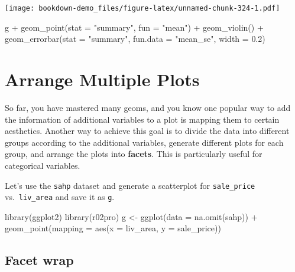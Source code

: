 \documentclass[
]{book}
\newenvironment{Shaded}{\begin{snugshade}}{\end{snugshade}}
\newcommand{\AttributeTok}[1]{\textcolor[rgb]{0.77,0.63,0.00}{#1}}
\newcommand{\FloatTok}[1]{\textcolor[rgb]{0.00,0.00,0.81}{#1}}
\newcommand{\FunctionTok}[1]{\textcolor[rgb]{0.00,0.00,0.00}{#1}}
\newcommand{\NormalTok}[1]{#1}
\newcommand{\OtherTok}[1]{\textcolor[rgb]{0.56,0.35,0.01}{#1}}
\newcommand{\SpecialCharTok}[1]{\textcolor[rgb]{0.00,0.00,0.00}{#1}}
\newcommand{\StringTok}[1]{\textcolor[rgb]{0.31,0.60,0.02}{#1}}
\begin{document}
\texttt{[image: bookdown-demo\_files/figure-latex/unnamed-chunk-324-1.pdf]}

\begin{Shaded}
\begin{Highlighting}[]
\NormalTok{g  }\SpecialCharTok{+} \FunctionTok{geom\_point}\NormalTok{(}\AttributeTok{stat =} \StringTok{"summary"}\NormalTok{, }\AttributeTok{fun =} \StringTok{"mean"}\NormalTok{) }\SpecialCharTok{+} 
  \FunctionTok{geom\_violin}\NormalTok{() }\SpecialCharTok{+} 
  \FunctionTok{geom\_errorbar}\NormalTok{(}\AttributeTok{stat =} \StringTok{"summary"}\NormalTok{, }\AttributeTok{fun.data =} \StringTok{"mean\_se"}\NormalTok{, }\AttributeTok{width =} \FloatTok{0.2}\NormalTok{)}
\end{Highlighting}
\end{Shaded}

\hypertarget{arrange-multi-plots}{%
\section{Arrange Multiple Plots}\label{arrange-multi-plots}}

So far, you have mastered many geoms, and you know one popular way to add the information of additional variables to a plot is mapping them to certain aesthetics. Another way to achieve this goal is to divide the data into different groups according to the additional variables, generate different plots for each group, and arrange the plots into \textbf{facets}. This is particularly useful for categorical variables.

Let's use the \texttt{sahp} dataset and generate a scatterplot for \texttt{sale\_price} vs.~\texttt{liv\_area} and save it as \texttt{g}.

\begin{Shaded}
\begin{Highlighting}[]
\FunctionTok{library}\NormalTok{(ggplot2)}
\FunctionTok{library}\NormalTok{(r02pro)}
\NormalTok{g }\OtherTok{\textless{}{-}} \FunctionTok{ggplot}\NormalTok{(}\AttributeTok{data =} \FunctionTok{na.omit}\NormalTok{(sahp)) }\SpecialCharTok{+} \FunctionTok{geom\_point}\NormalTok{(}\AttributeTok{mapping =} \FunctionTok{aes}\NormalTok{(}\AttributeTok{x =}\NormalTok{ liv\_area, }\AttributeTok{y =}\NormalTok{ sale\_price))}
\end{Highlighting}
\end{Shaded}

\hypertarget{facet-wrap}{%
\subsection{Facet wrap}\label{facet-wrap}}
\end{document}
